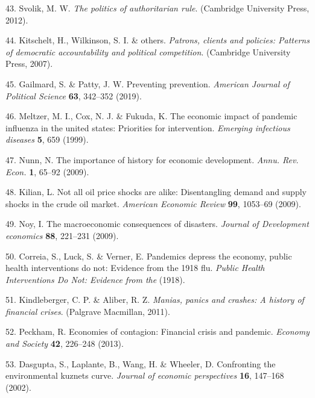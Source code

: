 \documentclass[]{article}
\begin{document}
\leavevmode\hypertarget{ref-svolik2012politics}{}%
43. Svolik, M. W. \emph{The politics of authoritarian rule}. (Cambridge University Press, 2012).

\leavevmode\hypertarget{ref-kitschelt2007patrons}{}%
44. Kitschelt, H., Wilkinson, S. I. \& others. \emph{Patrons, clients and policies: Patterns of democratic accountability and political competition}. (Cambridge University Press, 2007).

\leavevmode\hypertarget{ref-gailmard2019preventing}{}%
45. Gailmard, S. \& Patty, J. W. Preventing prevention. \emph{American Journal of Political Science} \textbf{63}, 342--352 (2019).

\leavevmode\hypertarget{ref-meltzer1999economic}{}%
46. Meltzer, M. I., Cox, N. J. \& Fukuda, K. The economic impact of pandemic influenza in the united states: Priorities for intervention. \emph{Emerging infectious diseases} \textbf{5}, 659 (1999).

\leavevmode\hypertarget{ref-nunn2009importance}{}%
47. Nunn, N. The importance of history for economic development. \emph{Annu. Rev. Econ.} \textbf{1}, 65--92 (2009).

\leavevmode\hypertarget{ref-kilian2009not}{}%
48. Kilian, L. Not all oil price shocks are alike: Disentangling demand and supply shocks in the crude oil market. \emph{American Economic Review} \textbf{99}, 1053--69 (2009).

\leavevmode\hypertarget{ref-noy2009macroeconomic}{}%
49. Noy, I. The macroeconomic consequences of disasters. \emph{Journal of Development economics} \textbf{88}, 221--231 (2009).

\leavevmode\hypertarget{ref-correia1918pandemics}{}%
50. Correia, S., Luck, S. \& Verner, E. Pandemics depress the economy, public health interventions do not: Evidence from the 1918 flu. \emph{Public Health Interventions Do Not: Evidence from the} (1918).

\leavevmode\hypertarget{ref-kindleberger2011manias}{}%
51. Kindleberger, C. P. \& Aliber, R. Z. \emph{Manias, panics and crashes: A history of financial crises}. (Palgrave Macmillan, 2011).

\leavevmode\hypertarget{ref-peckham2013economies}{}%
52. Peckham, R. Economies of contagion: Financial crisis and pandemic. \emph{Economy and Society} \textbf{42}, 226--248 (2013).

\leavevmode\hypertarget{ref-dasgupta2002confronting}{}%
53. Dasgupta, S., Laplante, B., Wang, H. \& Wheeler, D. Confronting the environmental kuznets curve. \emph{Journal of economic perspectives} \textbf{16}, 147--168 (2002).
\end{document}
